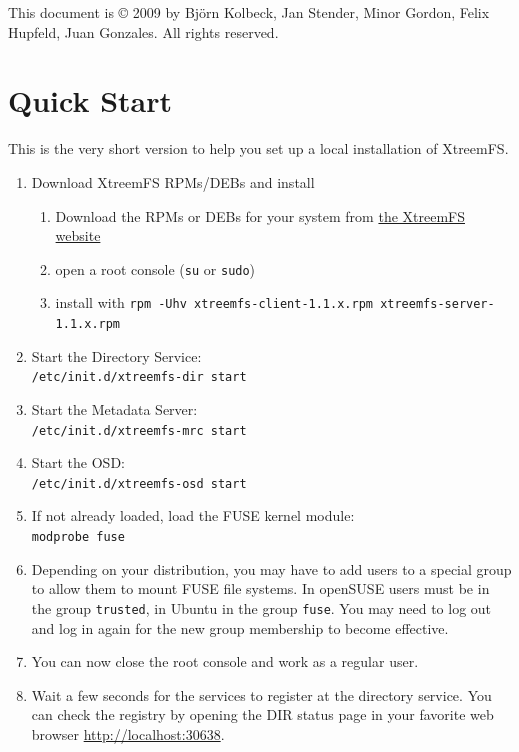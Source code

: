 \documentclass[a4paper,10pt]{book}
\begin{document}
This document is \copyright{} 2009 by Bj\"orn Kolbeck, Jan Stender, Minor Gordon, Felix Hupfeld, Juan Gonzales. All rights reserved.

\setcounter{tocdepth}{10}
\tableofcontents

\chapter{Quick Start}

This is the very short version to help you set up a local installation of XtreemFS.

\begin{enumerate}
 \item Download XtreemFS RPMs/DEBs and install
	\begin{enumerate}
		\item Download the RPMs or DEBs for your system from \href{http://www.XtreemFS.com}{the XtreemFS website}
		\item open a root console (\texttt{su} or \texttt{sudo})
		\item install with \texttt{rpm -Uhv xtreemfs-client-1.1.x.rpm xtreemfs-server-1.1.x.rpm}
	\end{enumerate}
\item Start the Directory Service:\\
	\texttt{/etc/init.d/xtreemfs-dir start}
\item Start the Metadata Server:\\
	\texttt{/etc/init.d/xtreemfs-mrc start}
\item Start the OSD:\\
	\texttt{/etc/init.d/xtreemfs-osd start}

\item If not already loaded, load the FUSE kernel module:\\
	\texttt{modprobe fuse}

\item Depending on your distribution, you may have to add users to a special group to allow them to mount FUSE file systems. In openSUSE users must be in the group \texttt{trusted}, in Ubuntu in the group \texttt{fuse}. You may need to log out and log in again for the new group membership to become effective.

\item You can now close the root console and work as a regular user.

\item Wait a few seconds for the services to register at the directory service. You can check the registry by opening the DIR status page in your favorite web browser \href{http://localhost:30638}{http://localhost:30638}.


\end{enumerate}
\end{document}
